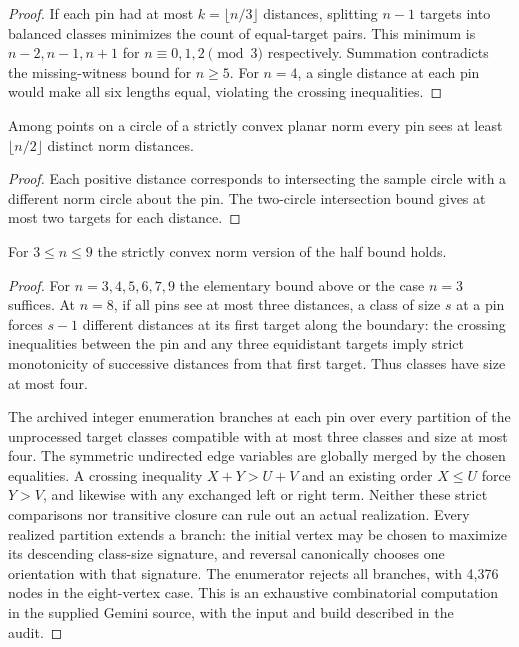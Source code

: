 \begin{proof}
If each pin had at most \(k=\lfloor n/3\rfloor\) distances, splitting \(n-1\) targets into balanced classes minimizes the count of equal-target pairs. This minimum is \(n-2,n-1,n+1\) for \(n\equiv0,1,2\pmod 3\) respectively. Summation contradicts the missing-witness bound for \(n\ge5\). For \(n=4\), a single distance at each pin would make all six lengths equal, violating the crossing inequalities.
\end{proof}

\begin{corollary}[982-T03]
Among points on a circle of a strictly convex planar norm every pin sees at least \(\lfloor n/2\rfloor\) distinct norm distances.
\end{corollary}
\begin{proof}
Each positive distance corresponds to intersecting the sample circle with a different norm circle about the pin. The two-circle intersection bound gives at most two targets for each distance.
\end{proof}

\begin{proposition}[982-T01]
For \(3\le n\le9\) the strictly convex norm version of the half bound holds.
\end{proposition}
\begin{proof}
For \(n=3,4,5,6,7,9\) the elementary bound above or the case \(n=3\) suffices. At \(n=8\), if all pins see at most three distances, a class of size \(s\) at a pin forces \(s-1\) different distances at its first target along the boundary: the crossing inequalities between the pin and any three equidistant targets imply strict monotonicity of successive distances from that first target. Thus classes have size at most four.

The archived integer enumeration branches at each pin over every partition of the unprocessed target classes compatible with at most three classes and size at most four. The symmetric undirected edge variables are globally merged by the chosen equalities. A crossing inequality \(X+Y>U+V\) and an existing order \(X\le U\) force \(Y>V\), and likewise with any exchanged left or right term. Neither these strict comparisons nor transitive closure can rule out an actual realization. Every realized partition extends a branch: the initial vertex may be chosen to maximize its descending class-size signature, and reversal canonically chooses one orientation with that signature. The enumerator rejects all branches, with 4,376 nodes in the eight-vertex case. This is an exhaustive combinatorial computation in the supplied Gemini source, with the input and build described in the audit.
\end{proof}
